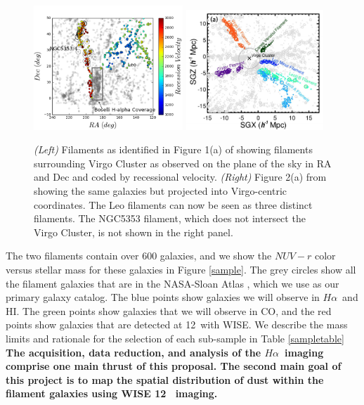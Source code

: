\documentclass[11pt, preprint]{aastex}
\newcommand{\ha}{$H\alpha$}
\begin{document}
\begin{figure}[h]
\centering
\includegraphics[width=0.5\textwidth]{filaments.png}
\includegraphics[width=0.46\textwidth]{KimFig2a.png}
\caption{\small {\it (Left)} Filaments as identified in Figure 1(a) of \citet{kim16} showing filaments
  surrounding Virgo Cluster as observed on the plane of the sky in RA and Dec and coded by recessional velocity.  {\it (Right)} Figure 2(a) from \citet{kim16} showing the same galaxies but projected into
Virgo-centric coordinates.  The Leo filaments can now be seen as three
distinct filaments.  The NGC5353 filament, which does not intersect
the Virgo Cluster, is not shown in the right panel.}
\label{kimfigure}
\end{figure}



The two filaments contain over 600 galaxies, and we show the $NUV-r$
color versus stellar mass for these galaxies in Figure \ref{sample}.
The grey circles show all the filament galaxies that are in the
NASA-Sloan Atlas \citep{blanton05}, which we use as our primary galaxy
catalog.  The blue points show galaxies we will observe in \ha \ and
HI.  The green points show galaxies that we will
observe in CO, and the red points show galaxies that are detected at
12\micron \ with WISE.  We describe the mass limits and rationale for
the selection of each sub-sample in Table \ref{sampletable}
{\bf  The acquisition, data reduction, and analysis of
the \ha \ imaging comprise one main thrust of this proposal.
The second main goal of this project is to map the spatial
distribution of dust within the filament galaxies using WISE 12\micron
\ imaging.  }
\end{document}
